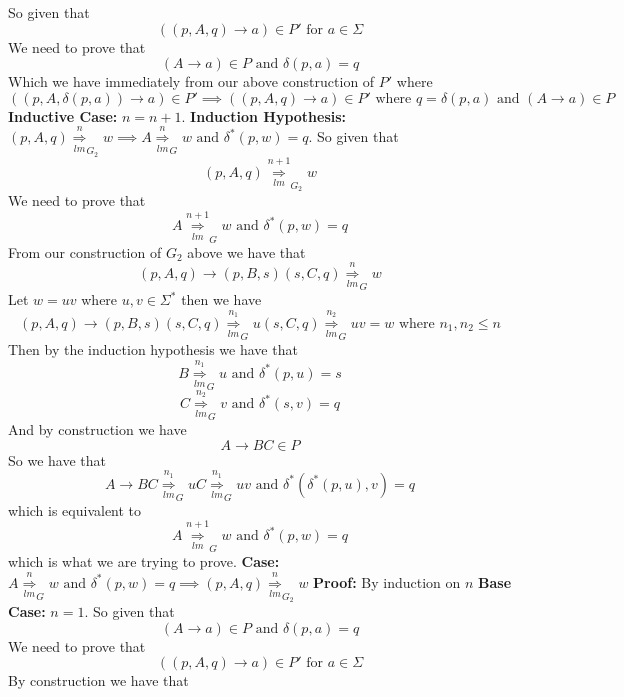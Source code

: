 \documentclass[12pt]{article}
\begin{document}
\medskip \newline
So given that
$$((p,A,q) \rightarrow a) \in P' \text{ for } a\in \Sigma$$
We need to prove that
$$ (A \rightarrow a) \in P \text{ and } \delta(p,a) = q$$
Which we have immediately from our above construction of $P'$ where
$$((p,A,\delta(p,a)) \rightarrow a) \in P' \implies
((p,A,q) \rightarrow a) \in P' \text{ where } q=\delta(p,a) \text{ and }
(A\rightarrow a) \in P$$
\newline \textbf{Inductive Case: } $n = n+1$.
\newline \textbf{Induction Hypothesis: }
$(p,A,q) \underset{lm}{\overset{n}{\Longrightarrow}}_{G_2} w
\implies A \underset{lm}{\overset{n}{\Longrightarrow}}_{G} w
\text{ and } \delta^*(p,w) = q$.
\medskip \newline
So given that
$$(p,A,q) \underset{lm}{\overset{n+1}{\Longrightarrow}}_{G_2} w$$
We need to prove that
$$A \underset{lm}{\overset{n+1}{\Longrightarrow}}_{G} w
\text{ and } \delta^*(p,w) = q$$
From our construction of $G_2$ above we have that
$$(p,A,q) \rightarrow (p,B,s)(s,C,q)
\underset{lm}{\overset{n}{\Longrightarrow}}_{G} w$$
Let $w=uv$ where $u,v\in \Sigma^*$ then we have
$$ (p,A,q) \rightarrow (p,B,s)(s,C,q)
\underset{lm}{\overset{n_1}{\Longrightarrow}}_{G} u(s,C,q)
\underset{lm}{\overset{n_2}{\Longrightarrow}}_{G} uv = w
\text{ where } n_1,n_2 \le n $$
Then by the induction hypothesis we have that
$$B \underset{lm}{\overset{n_1}{\Longrightarrow}}_{G} u
\text{ and } \delta^*(p,u) = s$$
$$C \underset{lm}{\overset{n_2}{\Longrightarrow}}_{G} v
\text{ and } \delta^*(s,v) = q$$
And by construction we have
$$A\rightarrow BC \in P$$
So we have that
$$A \rightarrow BC \underset{lm}{\overset{n_1}{\Longrightarrow}}_{G} uC
\underset{lm}{\overset{n_1}{\Longrightarrow}}_{G} uv
\text{ and } \delta^*(\delta^*(p,u),v) = q$$
which is equivalent to
$$A \underset{lm}{\overset{n+1}{\Longrightarrow}}_{G} w
\text{ and } \delta^*(p,w) = q$$
which is what we are trying to prove.
\medskip \newline
\textbf{Case: } $A \underset{lm}{\overset{n}{\Longrightarrow}}_{G} w
\text{ and } \delta^*(p,w) = q \implies
(p,A,q) \underset{lm}{\overset{n}{\Longrightarrow}}_{G_2} w$
\newline \textbf{Proof: } By induction on $n$
\newline \textbf{Base Case: } $n = 1$.
\medskip \newline
So given that
$$ (A \rightarrow a) \in P \text{ and } \delta(p,a) = q$$
We need to prove that
$$((p,A,q) \rightarrow a) \in P' \text{ for } a\in \Sigma$$
By construction we have that
\end{document}
